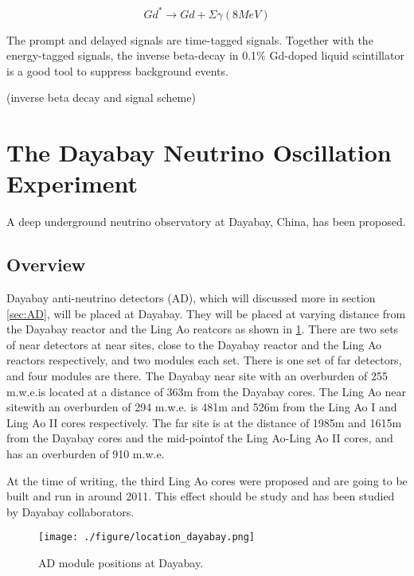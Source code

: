 \begin{equation}
Gd^* \rightarrow Gd + \Sigma \gamma (8 MeV)
\label{GdStarToGd}
\end{equation}


The prompt and delayed signals are time-tagged signals.
Together with the energy-tagged signals, the inverse beta-decay
in 0.1\% Gd-doped liquid scintillator is a good tool to suppress
background events.


(inverse beta decay and signal scheme)


\section{The Dayabay Neutrino Oscillation Experiment}

A deep underground neutrino observatory at Dayabay, China, has
been proposed. \cite{TDR}

\subsection{Overview}

Dayabay anti-neutrino detectors (AD), which will discussed more in section \ref{sec:AD},
will be placed at Dayabay. They will be placed at varying distance from the Dayabay reactor and
the Ling Ao reatcors as shown in \ref{fig:location_dayabay.png}. There are two sets of near detectors
at near sites, close to the Dayabay reactor and the Ling Ao reactors respectively, and two modules each set.
There is one set of far detectors, and four modules are there. The Dayabay near site with an overburden of
255 m.w.e.is located at a distance of 363m from the Dayabay cores. The Ling Ao near sitewith an overburden of
294 m.w.e. is 481m and 526m from the Ling Ao I and Ling Ao II cores respectively. The far site is at the distance
of 1985m and 1615m from the Dayabay cores and the mid-pointof the Ling Ao-Ling Ao II cores, and has an overburden
of 910 m.w.e.

At the time of writing, the third Ling Ao cores were proposed and are going to be built and run in around
2011. This effect should be study and has been studied by Dayabay collaborators.


\begin{figure}[h]
    \centering
    \texttt{[image: ./figure/location\_dayabay.png]}
    \caption{AD module positions at Dayabay.}
    \label{fig:location_dayabay.png}
    \end{figure}


